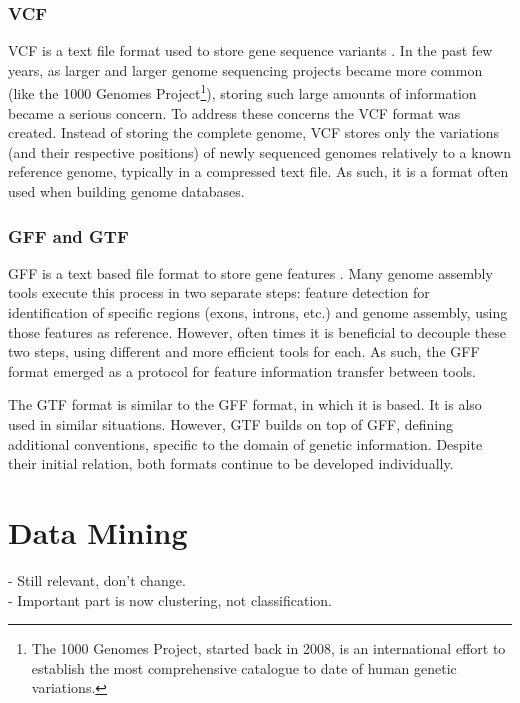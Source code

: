 \subsubsection*{VCF}

VCF is a text file format used to store gene sequence variants \cite{smith13}.
In the past few years, as larger and larger genome sequencing projects became
more common (like the 1000 Genomes Project\footnote{The 1000 Genomes Project,
started back in 2008, is an international effort to establish the most
comprehensive catalogue to date of human genetic variations.}), storing such
large amounts of information became a serious concern. To address these concerns
the VCF format was created. Instead of storing the complete genome, VCF stores
only the variations (and their respective positions) of newly sequenced genomes
relatively to a known reference genome, typically in a compressed text file. As
such, it is a format often used when building genome databases.

\subsubsection*{GFF and GTF}

GFF is a text based file format to store gene features \cite{sanger11}. Many
genome assembly tools execute this process in two separate steps: feature
detection for identification of specific regions (exons, introns, etc.) and
genome assembly, using those features as reference. However, often times it is
beneficial to decouple these two steps, using different and more efficient tools
for each. As such, the GFF format emerged as a protocol for feature information
transfer between tools.

The GTF format is similar to the GFF format, in which it is based. It is also
used in similar situations. However, GTF builds on top of GFF, defining
additional conventions, specific to the domain of genetic information. Despite
their initial relation, both formats continue to be developed individually.

\section{Data Mining}\label{sec:mlearning}

\begin{Notes}
- Still relevant, don't change.\\
- Important part is now clustering, not classification.
\end{Notes}

